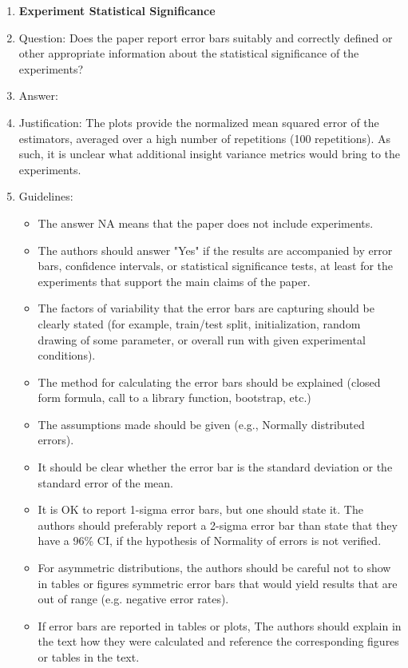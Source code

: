 \documentclass{article}
\begin{document}
\begin{enumerate}
\item {\bf Experiment Statistical Significance}
    \item[] Question: Does the paper report error bars suitably and correctly defined or other appropriate information about the statistical significance of the experiments?
    \item[] Answer: \answerNo{} %
    \item[] Justification: The plots provide the normalized mean squared error of the estimators, averaged over a high number of repetitions (100 repetitions). As such, it is unclear what additional insight variance metrics would bring to the experiments.
    \item[] Guidelines:
    \begin{itemize}
        \item The answer NA means that the paper does not include experiments.
        \item The authors should answer "Yes" if the results are accompanied by error bars, confidence intervals, or statistical significance tests, at least for the experiments that support the main claims of the paper.
        \item The factors of variability that the error bars are capturing should be clearly stated (for example, train/test split, initialization, random drawing of some parameter, or overall run with given experimental conditions).
        \item The method for calculating the error bars should be explained (closed form formula, call to a library function, bootstrap, etc.)
        \item The assumptions made should be given (e.g., Normally distributed errors).
        \item It should be clear whether the error bar is the standard deviation or the standard error of the mean.
        \item It is OK to report 1-sigma error bars, but one should state it. The authors should preferably report a 2-sigma error bar than state that they have a 96\% CI, if the hypothesis of Normality of errors is not verified.
        \item For asymmetric distributions, the authors should be careful not to show in tables or figures symmetric error bars that would yield results that are out of range (e.g. negative error rates).
        \item If error bars are reported in tables or plots, The authors should explain in the text how they were calculated and reference the corresponding figures or tables in the text.
    \end{itemize}


\end{enumerate}
\end{document}
